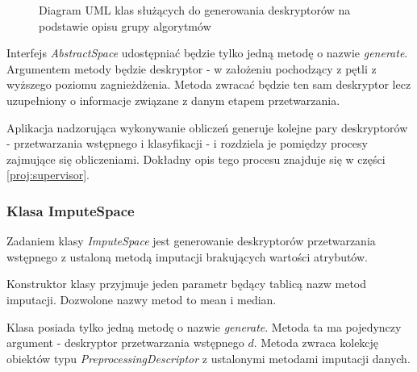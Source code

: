 \documentclass[../thesis.tex]{subfiles}
\begin{document}
\begin{figure}[h]
\centering
{}
\caption{Diagram UML klas służących do generowania deskryptorów na podstawie opisu grupy algorytmów}
\label{proj:diagram_spaces}
\end{figure}

Interfejs \emph{AbstractSpace} udostępniać będzie tylko jedną metodę o nazwie \emph{generate}. Argumentem metody będzie deskryptor - w założeniu pochodzący z pętli z wyższego poziomu zagnieżdżenia. Metoda zwracać będzie ten sam deskryptor lecz uzupełniony o informacje związane z danym etapem przetwarzania.

Aplikacja nadzorująca wykonywanie obliczeń generuje kolejne pary deskryptorów - przetwarzania wstępnego i klasyfikacji - i rozdziela je pomiędzy procesy zajmujące się obliczeniami. Dokładny opis tego procesu znajduje się w części \ref{proj:supervisor}.

\subsubsection{Klasa ImputeSpace}

Zadaniem klasy \emph{ImputeSpace} jest generowanie deskryptorów przetwarzania wstępnego z ustaloną metodą imputacji brakujących wartości atrybutów. 

Konstruktor klasy przyjmuje jeden parametr będący tablicą nazw metod imputacji. Dozwolone nazwy metod to mean i median. 

Klasa posiada tylko jedną metodę o nazwie \emph{generate}. Metoda ta ma pojedynczy argument - deskryptor przetwarzania wstępnego $d$. Metoda zwraca kolekcję obiektów typu \emph{PreprocessingDescriptor} z ustalonymi metodami imputacji danych.
\end{document}
